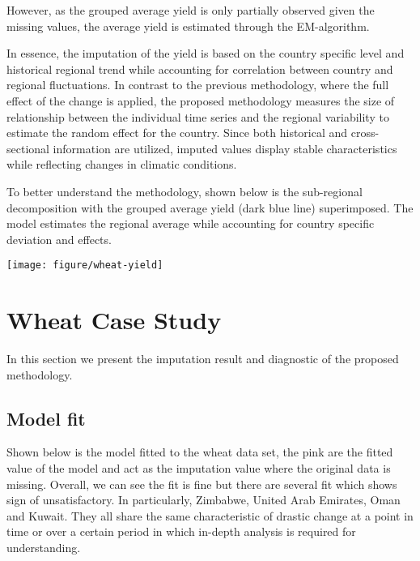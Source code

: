 \documentclass[nojss]{jss}\usepackage[]{graphicx}\usepackage[]{color}
\makeatletter
\def\maxwidth{ %
  \ifdim\Gin@nat@width>\linewidth
    \linewidth
  \else
    \Gin@nat@width
  \fi
}
\newenvironment{knitrout}{}{} %
\makeatother
\begin{document}
However, as the grouped average yield is only partially observed
given the missing values, the average yield is estimated through the
EM-algorithm.


In essence, the imputation of the yield is based on the country
specific level and historical regional trend while accounting for
correlation between country and regional fluctuations. In contrast to
the previous methodology, where the full effect of the change is
applied, the proposed methodology measures the size of relationship
between the individual time series and the regional variability to
estimate the random effect for the country. Since both historical and
cross-sectional information are utilized, imputed values display
stable characteristics while reflecting changes in climatic
conditions.



To better understand the methodology, shown below is the sub-regional
decomposition with the grouped average yield (dark blue line)
superimposed. The model estimates the regional average while
accounting for country specific deviation and effects.


\begin{knitrout}
\color{fgcolor}

{\centering \texttt{[image: figure/wheat-yield]} 

}



\end{knitrout}



\section{Wheat Case Study}
In this section we present the imputation result and diagnostic of the
proposed methodology.


\subsection{Model fit}
Shown below is the model fitted to the wheat data set, the pink are
the fitted value of the model and act as the imputation value where
the original data is missing. Overall, we can see the fit is fine but
there are several fit which shows sign of unsatisfactory. In
particularly, Zimbabwe, United Arab Emirates, Oman and Kuwait. They
all share the same characteristic of drastic change at a point in time
or over a certain period in which in-depth analysis is required for
understanding.
\end{document}
